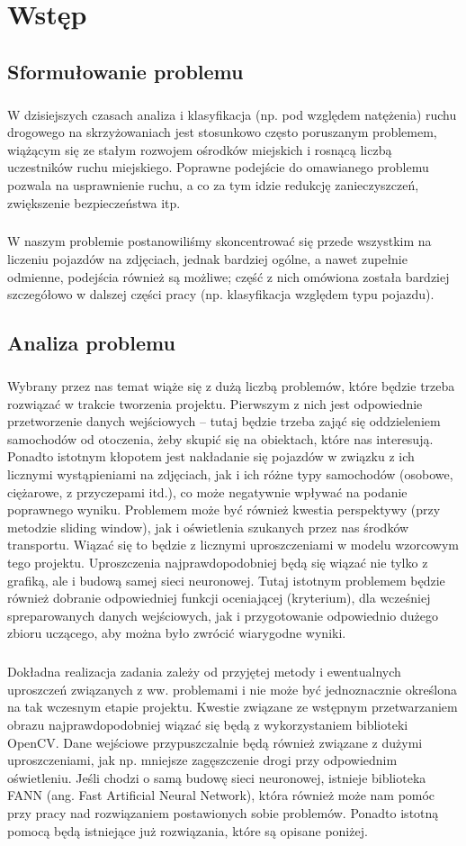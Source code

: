 \documentclass{article}
\begin{document}
\tableofcontents
\newpage

\section{Wstęp}
\subsection{Sformułowanie problemu}
\subparagraph{} W dzisiejszych czasach analiza i klasyfikacja (np. pod względem natężenia) ruchu drogowego na skrzyżowaniach jest stosunkowo często poruszanym problemem, wiążącym się ze stałym rozwojem ośrodków miejskich i rosnącą liczbą uczestników ruchu miejskiego. Poprawne podejście do omawianego problemu pozwala na usprawnienie ruchu, a co za tym idzie redukcję zanieczyszczeń, zwiększenie bezpieczeństwa itp.
\subparagraph{} W naszym problemie postanowiliśmy skoncentrować się przede wszystkim na liczeniu pojazdów na zdjęciach, jednak bardziej ogólne, a nawet zupełnie odmienne, podejścia również są możliwe; część z nich omówiona została bardziej szczegółowo w dalszej części pracy (np. klasyfikacja względem typu pojazdu).

\subsection{Analiza problemu}
\subparagraph{} Wybrany przez nas temat wiąże się z dużą liczbą problemów, które będzie trzeba rozwiązać w trakcie tworzenia projektu. Pierwszym z nich jest odpowiednie przetworzenie danych wejściowych – tutaj będzie trzeba zająć się oddzieleniem samochodów od otoczenia, żeby skupić się na obiektach, które nas interesują. Ponadto istotnym kłopotem jest nakładanie się pojazdów w związku z ich licznymi wystąpieniami na zdjęciach, jak i ich różne typy samochodów (osobowe, ciężarowe, z przyczepami itd.), co może negatywnie wpływać na podanie poprawnego wyniku. Problemem może być również kwestia perspektywy (przy metodzie sliding window), jak i oświetlenia szukanych przez nas środków transportu. Wiązać się to będzie z licznymi uproszczeniami w modelu wzorcowym tego projektu. Uproszczenia najprawdopodobniej będą się wiązać nie tylko z grafiką, ale i budową samej sieci neuronowej. Tutaj istotnym problemem będzie również dobranie odpowiedniej funkcji oceniającej (kryterium), dla wcześniej spreparowanych danych wejściowych, jak i przygotowanie odpowiednio dużego zbioru uczącego, aby można było zwrócić wiarygodne wyniki.
\subparagraph{} Dokładna realizacja zadania  zależy od przyjętej metody i ewentualnych uproszczeń związanych z ww. problemami i nie może być jednoznacznie określona na tak wczesnym etapie projektu. Kwestie związane ze wstępnym przetwarzaniem obrazu najprawdopodobniej wiązać się będą z wykorzystaniem biblioteki OpenCV. Dane wejściowe przypuszczalnie będą również związane z dużymi uproszczeniami, jak np. mniejsze zagęszczenie drogi przy odpowiednim oświetleniu. Jeśli chodzi o samą budowę sieci neuronowej, istnieje biblioteka FANN (ang. Fast Artificial Neural Network), która również może nam pomóc przy pracy nad rozwiązaniem postawionych sobie problemów. Ponadto istotną pomocą będą istniejące już rozwiązania, które są opisane poniżej. 
 
\end{document}

